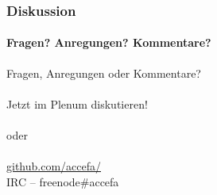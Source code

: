 \begin{frame}\thispagestyle{empty}
	\frametitle{Diskussion \hfill{} \footnotesize \group}
	\framesubtitle{Fragen? Anregungen? Kommentare?}
	\begin{center}
		\Large
		Fragen, Anregungen oder Kommentare?\\~\\
		Jetzt im Plenum diskutieren!\\~\\
		oder\\~\\
		\url{github.com/accefa/}\\
		IRC -- freenode\#accefa
	\end{center}
\end{frame}
